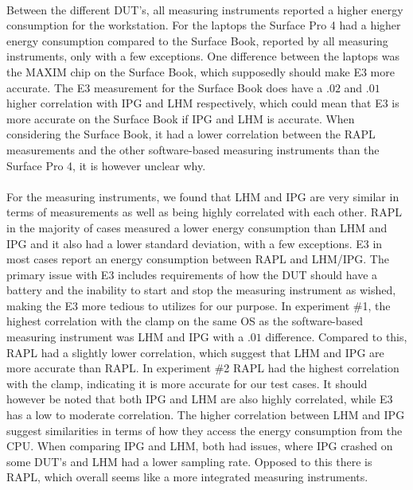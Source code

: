 \paragraph*{}
Between the different DUT's, all measuring instruments reported a higher energy consumption for the workstation. For the laptops the Surface Pro 4 had a higher energy consumption compared to the Surface Book, reported by all measuring instruments, only with a few exceptions. One difference between the laptops was the MAXIM chip on the Surface Book, which supposedly should make E3 more accurate. The E3 measurement for the Surface Book does have a $.02$ and $.01$ higher correlation with IPG and LHM respectively, which could mean that E3 is more accurate on the Surface Book if IPG and LHM is accurate. When considering the Surface Book, it had a lower correlation between the RAPL measurements and the other software-based measuring instruments than the Surface Pro 4, it is however unclear why.

\paragraph*{}
For the measuring instruments, we found that LHM and IPG are very similar in terms of measurements as well as being highly correlated with each other. RAPL in the majority of cases measured a lower energy consumption than LHM and IPG and it also had a lower standard deviation, with a few exceptions. E3 in most cases report an energy consumption between RAPL and LHM/IPG. The primary issue with E3 includes requirements of how the DUT should have a battery and the inability to start and stop the measuring instrument as wished, making the E3 more tedious to utilizes for our purpose. In experiment \#1, the highest correlation with the clamp on the same OS as the software-based measuring instrument was LHM and IPG with a $.01$ difference. Compared to this, RAPL had a slightly lower correlation, which suggest that LHM and IPG are more accurate than RAPL. In experiment \#2 RAPL had the highest correlation with the clamp, indicating it is more accurate for our test cases. It should however be noted that both IPG and LHM are also highly correlated, while E3 has a low to moderate correlation. The higher correlation between LHM and IPG suggest similarities in terms of how they access the energy consumption from the CPU. When comparing IPG and LHM, both had issues, where IPG crashed on some DUT's and LHM had a lower sampling rate. Opposed to this there is RAPL, which overall seems like a more integrated measuring instruments.
